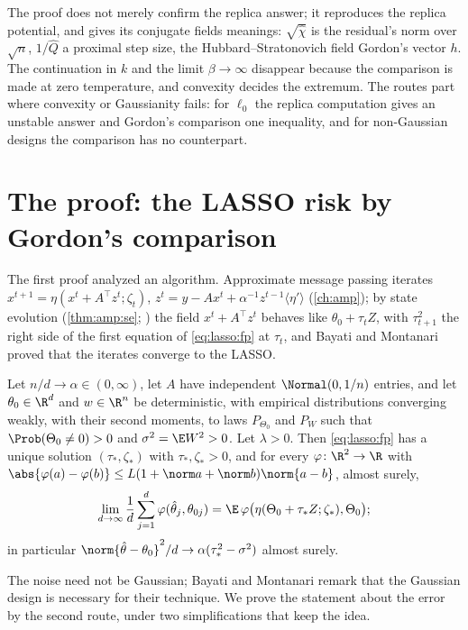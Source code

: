 \begin{refsection}
The proof does not merely confirm the replica answer; it reproduces the replica potential, and gives its conjugate fields meanings: $\sqrt{\hat\chi}$ is the residual's norm over $\sqrt n$, $1/\hat Q$ a proximal step size, the Hubbard--Stratonovich field Gordon's vector $h$. The continuation in $k$ and the limit $\beta\to\infty$ disappear because the comparison is made at zero temperature, and convexity decides the extremum. The routes part where convexity or Gaussianity fails: for $\ell_0$ the replica computation gives an unstable answer and Gordon's comparison one inequality, and for non-Gaussian designs the comparison has no counterpart.

\section{The proof: the LASSO risk by Gordon's comparison}\label{sec:lasso:proof}

The first proof analyzed an algorithm. Approximate message passing iterates $x^{t+1}=\eta(x^t+A^\top z^t;\zeta_t)$, $z^t=y-Ax^t+\alpha^{-1}z^{t-1}\langle\eta'\rangle$ (\cref{ch:amp}); by state evolution (\cref{thm:amp:se}; \textcite{BayatiMontanari2011}) the field $x^t+A^\top z^t$ behaves like $\theta_0+\tau_tZ$, with $\tau_{t+1}^2$ the right side of the first equation of \eqref{eq:lasso:fp} at $\tau_t$, and Bayati and Montanari proved that the iterates converge to the LASSO.

\begin{theorem}\label{thm:lasso:risk}
Let $n/d\to\alpha\in(0,\infty)$, let $A$ have independent $\Normal(0,1/n)$ entries, and let $\theta_0\in\R^d$ and $w\in\R^n$ be deterministic, with empirical distributions converging weakly, with their second moments, to laws $P_{\Theta_0}$ and $P_W$ such that $\Prob(\Theta_0\ne0)>0$ and $\sigma^2=\E W^2>0$. Let $\lambda>0$. Then \eqref{eq:lasso:fp} has a unique solution $(\tau_*,\zeta_*)$ with $\tau_*,\zeta_*>0$, and for every $\varphi\colon\R^2\to\R$ with $\abs{\varphi(a)-\varphi(b)}\le L(1+\norm a+\norm b)\norm{a-b}$, almost surely,
\[
\lim_{d\to\infty}\frac1d\sum_{j=1}^d\varphi(\hat\theta_j,\theta_{0j})=\E\,\varphi\bigl(\eta(\Theta_0+\tau_*Z;\zeta_*),\Theta_0\bigr);
\]
in particular $\norm{\hat\theta-\theta_0}^2/d\to\alpha(\tau_*^2-\sigma^2)$ almost surely.
\end{theorem}

The noise need not be Gaussian; Bayati and Montanari remark that the Gaussian design is necessary for their technique. We prove the statement about the error by the second route, under two simplifications that keep the idea.


\end{refsection}
